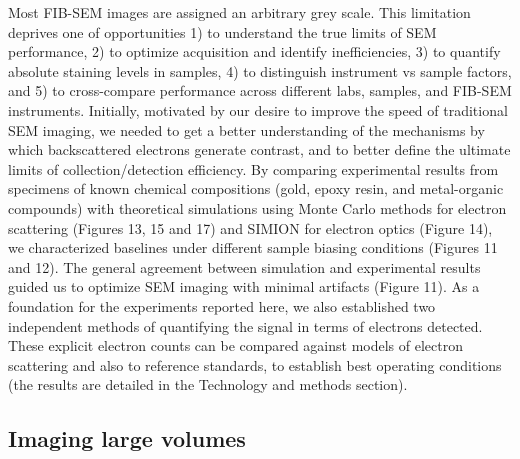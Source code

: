 \documentclass{article}
\begin{document}
Most FIB-SEM images are assigned an arbitrary grey scale. This limitation deprives one of opportunities 1) to understand the true limits of SEM performance, 2) to optimize acquisition and identify inefficiencies, 3) to quantify absolute staining levels in samples, 4) to distinguish instrument vs sample factors, and 5) to cross-compare performance across different labs, samples, and FIB-SEM instruments. Initially, motivated by our desire to improve the speed of traditional SEM imaging, we needed to get a better understanding of the mechanisms by which backscattered electrons generate contrast, and to better define the ultimate limits of collection/detection efficiency. By comparing experimental results from specimens of known chemical compositions (gold, epoxy resin, and metal-organic compounds) with theoretical simulations using Monte Carlo methods for electron scattering (Figures 13, 15 and 17) and SIMION for electron optics (Figure 14), we characterized baselines under different sample biasing conditions (Figures 11 and 12). The general agreement between simulation and experimental results guided us to optimize SEM imaging with minimal artifacts (Figure 11). As a foundation for the experiments reported here, we also established two independent methods of quantifying the signal in terms of electrons detected. These explicit electron counts can be compared against models of electron scattering and also to reference standards, to establish best operating conditions (the results are detailed in the Technology and methods section).

\subsection*{Imaging large volumes}
\end{document}
